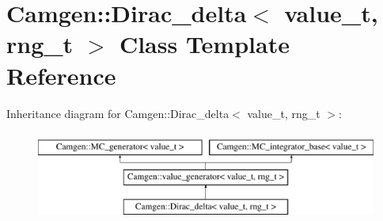 \hypertarget{a00128}{}\section{Camgen\+:\+:Dirac\+\_\+delta$<$ value\+\_\+t, rng\+\_\+t $>$ Class Template Reference}
\label{a00128}
Inheritance diagram for Camgen\+:\+:Dirac\+\_\+delta$<$ value\+\_\+t, rng\+\_\+t $>$\+:\begin{figure}[H]
\begin{center}
\leavevmode
\includegraphics[height=3.000000cm]{a00128}
\end{center}
\end{figure}
